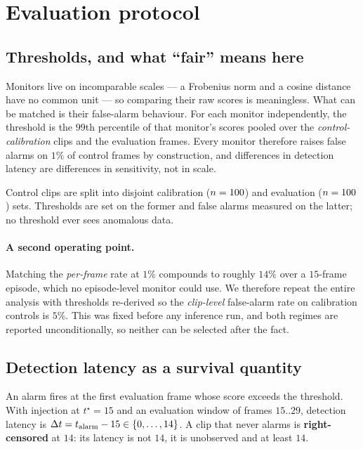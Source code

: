 \section{Evaluation protocol}
\label{sec:protocol}

\subsection{Thresholds, and what ``fair'' means here}

Monitors live on incomparable scales --- a Frobenius norm and a cosine distance
have no common unit --- so comparing their raw scores is meaningless. What can
be matched is their false-alarm behaviour. For each monitor independently, the
threshold is the $99$th percentile of that monitor's scores pooled over the
\emph{control-calibration} clips and the evaluation frames. Every monitor
therefore raises false alarms on $1\%$ of control frames by construction, and
differences in detection latency are differences in sensitivity, not in scale.

Control clips are split into disjoint calibration ($n=100$) and
evaluation ($n=100$) sets. Thresholds are set on the former and false
alarms measured on the latter; no threshold ever sees anomalous data.

\paragraph{A second operating point.}
Matching the \emph{per-frame} rate at $1\%$ compounds to roughly $14\%$ over a
$15$-frame episode, which no episode-level monitor could use. We therefore
repeat the entire analysis with thresholds re-derived so the \emph{clip-level}
false-alarm rate on calibration controls is $5\%$. This was fixed before any
inference run, and both regimes are reported unconditionally, so neither can be
selected after the fact.

\subsection{Detection latency as a survival quantity}

An alarm fires at the first evaluation frame whose score exceeds the threshold.
With injection at $t^\star = 15$ and an evaluation window of frames
$15..29$, detection latency is $\Delta t = t_{\text{alarm}} - 15 \in \{0,\dots,14\}$. A
clip that never alarms is \textbf{right-censored} at $14$: its latency is not
$14$, it is unobserved and at least $14$.

